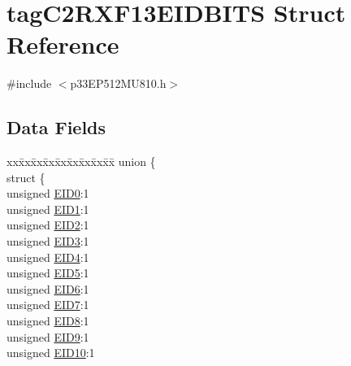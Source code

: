 \hypertarget{structtag_c2_r_x_f13_e_i_d_b_i_t_s}{}\section{tag\+C2\+R\+X\+F13\+E\+I\+D\+B\+I\+TS Struct Reference}
\label{structtag_c2_r_x_f13_e_i_d_b_i_t_s}


{\ttfamily \#include $<$p33\+E\+P512\+M\+U810.\+h$>$}

\subsection*{Data Fields}
\begin{DoxyCompactItemize}
\item 
\begin{tabbing}
xx\=xx\=xx\=xx\=xx\=xx\=xx\=xx\=xx\=\kill
union \{\\
\>struct \{\\
\>\>unsigned \hyperlink{structtag_c2_r_x_f13_e_i_d_b_i_t_s_a9da8b7b30247e4f9cd8cc056549aa9fd}{EID0}:1\\
\>\>unsigned \hyperlink{structtag_c2_r_x_f13_e_i_d_b_i_t_s_afd6c139491d147c1262f3d051c6691e9}{EID1}:1\\
\>\>unsigned \hyperlink{structtag_c2_r_x_f13_e_i_d_b_i_t_s_a36ec62d8d3c5acd5d15e6691dc099a94}{EID2}:1\\
\>\>unsigned \hyperlink{structtag_c2_r_x_f13_e_i_d_b_i_t_s_ab895f7d0ac289a0383b607cbc62eebe2}{EID3}:1\\
\>\>unsigned \hyperlink{structtag_c2_r_x_f13_e_i_d_b_i_t_s_a136d5a709d6618d40acceccb43036656}{EID4}:1\\
\>\>unsigned \hyperlink{structtag_c2_r_x_f13_e_i_d_b_i_t_s_a8dffb2d86a6c184df505ae7c71a58710}{EID5}:1\\
\>\>unsigned \hyperlink{structtag_c2_r_x_f13_e_i_d_b_i_t_s_af8a8574102515d8f1a4b7fd1685d0532}{EID6}:1\\
\>\>unsigned \hyperlink{structtag_c2_r_x_f13_e_i_d_b_i_t_s_a84c3262e67f8d5fd387ac10bde6fa9b1}{EID7}:1\\
\>\>unsigned \hyperlink{structtag_c2_r_x_f13_e_i_d_b_i_t_s_acca25e0b7d86eb499d01f85222baea87}{EID8}:1\\
\>\>unsigned \hyperlink{structtag_c2_r_x_f13_e_i_d_b_i_t_s_ac6748f73d4ada8538b06548be4f396c2}{EID9}:1\\
\>\>unsigned \hyperlink{structtag_c2_r_x_f13_e_i_d_b_i_t_s_a9cea8e77ecbb72bd3b08102412793725}{EID10}:1\\

\end{tabbing}
\end{DoxyCompactItemize}
